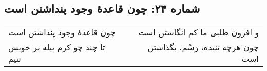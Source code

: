 \begin{center}
\section*{شماره ۲۴: چون قاعدۀ وجود پنداشتن است}
\label{sec:024}
\begin{longtable}{l p{0.5cm} r}
چون قاعدهٔ وجود پنداشتن است
&&
و افزون طلبی ما کم انگاشتن است
\\
تا چند چو کرم پیله بر خویش تنیم
&&
چون هرچه تنیده، رَسْم، بگذاشتن است
\\
\end{longtable}
\end{center}
